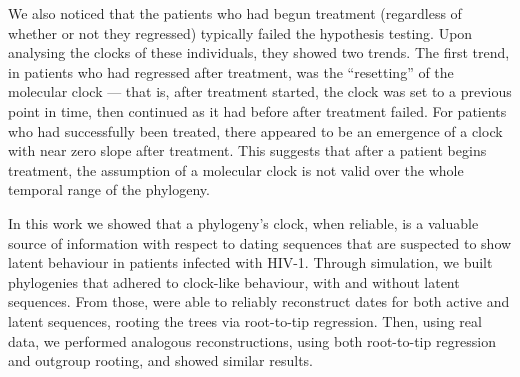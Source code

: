 \documentclass[12pt]{article}
\begin{document}




We also noticed that the patients who had begun treatment (regardless of whether or not they regressed) typically failed the hypothesis testing. Upon analysing the clocks of these individuals, they showed two trends. 
The first trend, in patients who had regressed after treatment, was the ``resetting'' of the molecular clock --- that is, after treatment started, the clock was set to a previous point in time, then continued as it had before after treatment failed. 
For patients who had successfully been treated, there appeared to be an emergence of a clock with near zero slope after treatment.
This suggests that after a patient begins treatment, the assumption of a molecular clock  is not valid over the whole temporal range of the phylogeny. 



In this work we showed that a phylogeny's clock, when reliable, is a valuable source of information with respect to dating sequences that are suspected to show latent behaviour in patients infected with HIV-1. 
Through simulation, we built phylogenies that adhered to clock-like behaviour, with and without latent sequences.
From those, were able to reliably reconstruct dates for both active and latent sequences, rooting the trees via root-to-tip regression.
Then, using real data, we performed analogous reconstructions, using both root-to-tip regression and outgroup rooting, and showed similar results.
\end{document}
